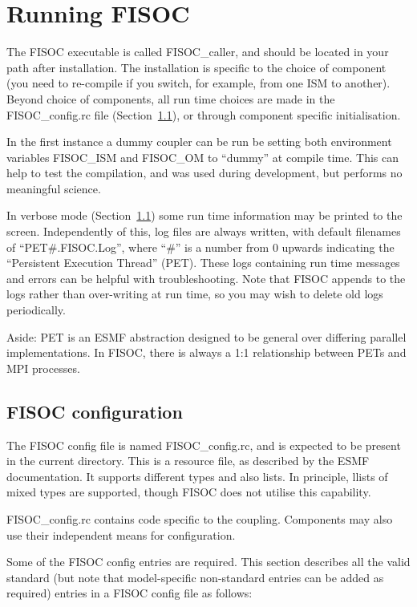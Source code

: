 \documentclass[12pt]{article}
\begin{document}
\section{Running FISOC}
\label{sec:FISOC_SUG}

The FISOC executable is called FISOC\_caller, and should be located in your path after installation. 
The installation is specific to the choice of component (you need to re-compile if you switch, for 
example, from one ISM to another).  
Beyond choice of components, all run time choices are made in the FISOC\_config.rc file
(Section~\ref{sec:config}), 
or through component specific initialisation.

In the first instance a dummy coupler can be run be setting both environment variables FISOC\_ISM and 
FISOC\_OM to ``dummy'' at compile time.  This can help to test the compilation, and was used during development, 
but performs no meaningful science.  

In verbose mode (Section~\ref{sec:config}) some run time information may be printed to the screen.  
Independently of this, log files are always written, 
with default filenames of ``PET\#.FISOC.Log'', where ``\#'' is a number from 0 upwards indicating the 
``Persistent Execution Thread'' (PET). 
These logs containing run time messages and errors can be helpful with troubleshooting.
Note that FISOC appends to the logs rather than over-writing at run time, so you may wish to delete old logs 
periodically. 

Aside: PET is an ESMF abstraction designed to be general over differing parallel implementations. 
In FISOC, there is always a 1:1 relationship between PETs and MPI processes. 


\subsection{FISOC configuration}
\label{sec:config}

The FISOC config file is named FISOC\_config.rc, and is expected to be present 
in the current directory.  
This is a resource file, as described by the 
ESMF documentation.  It supports different types and also lists. 
In principle, llists of mixed types are supported, though FISOC does not utilise this capability.

FISOC\_config.rc contains code specific to the coupling.  Components may also use their 
independent means for configuration.

Some of the FISOC config entries are required.
This section describes all the valid standard (but note that model-specific non-standard entries 
can be added as required) entries in a FISOC config file as follows:
\end{document}

